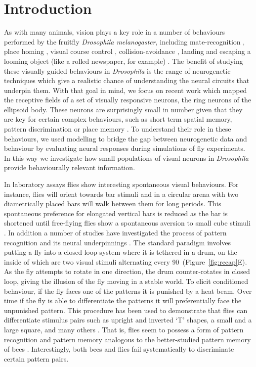 \documentclass[10pt]{article}
\begin{document}
\section{Introduction}
As with many animals, vision plays a key role in a number of behaviours performed by the fruitfly \emph{Drosophila melanogaster}, including mate-recognition \cite{Agrawal2014}, place homing \cite{Ofstad2011}, visual course control \cite{Borst2014}, collision-avoidance \cite{Tammero2002}, landing \cite{Tammero2002} and escaping a looming object (like a rolled newspaper, for example) \cite{Card2008}. The benefit of studying these visually guided behaviours in \emph{Drosophila} is the range of neurogenetic techniques which give a realistic chance of understanding the neural circuits that underpin them. With that goal in mind, we focus on recent work \cite{Seelig2013} which mapped the receptive fields of a set of visually responsive neurons, the ring neurons of the ellipsoid body. These neurons are surprisingly small in number given that they are key for certain complex behaviours, such as short term spatial memory, pattern discrimination or place memory \cite{Liu2006,Neuser2008,Seelig2015}. To understand their role in these behaviours, we used modelling to bridge the gap between neurogenetic data and behaviour by evaluating neural responses during simulations of fly experiments. In this way we investigate how small populations of visual neurons in \emph{Drosophila} provide behaviourally relevant information.

In laboratory assays flies show interesting spontaneous visual behaviours. For instance, flies will orient towards bar stimuli \cite{Reichardt1969,Gotz1987} and in a circular arena with two diametrically placed bars will walk between them for long periods. This spontaneous preference for elongated vertical bars is reduced as the bar is shortened until free-flying flies show a spontaneous aversion to small cube stimuli \cite{Maimon2008}. In addition a number of studies have investigated the process of pattern recognition and its neural underpinnings \cite{Ernst1999,Liu2006,Pan2009}. The standard paradigm involves putting a fly into a closed-loop system where it is tethered in a drum, on the inside of which are two visual stimuli alternating every 90\degree\ (Figure~\ref{fig:recap}E). As the fly attempts to rotate in one direction, the drum counter-rotates in closed loop, giving the illusion of the fly moving in a stable world. To elicit conditioned behaviour, if the fly faces one of the patterns it is punished by a heat beam. Over time if the fly is able to differentiate the patterns it will preferentially face the unpunished pattern. This procedure has been used to demonstrate that flies can differentiate stimulus pairs such as upright and inverted `T' shapes, a small and a large square, and many others \cite{Ernst1999}. That is, flies seem to possess a form of pattern recognition and pattern memory analogous to the better-studied pattern memory of bees \cite{vonFrisch1914,Giurfa1997,Horridge2009}. Interestingly, both bees and flies fail systematically to discriminate certain pattern pairs. 
\end{document}
